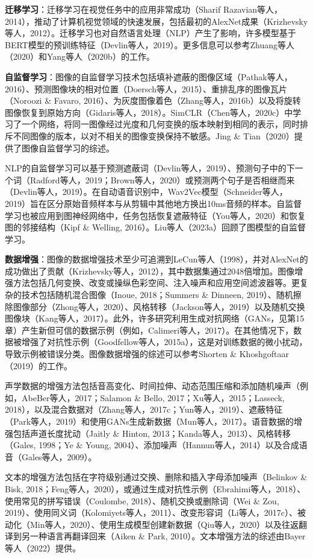 \documentclass[lang=cn,newtx,10pt,scheme=chinese]{elegantbook}
\begin{document}
\textbf{迁移学习}：迁移学习在视觉任务中的应用非常成功（Sharif Razavian等人，2014），推动了计算机视觉领域的快速发展，包括最初的AlexNet成果（Krizhevsky等人，2012）。迁移学习也对自然语言处理（NLP）产生了影响，许多模型基于BERT模型的预训练特征（Devlin等人，2019）。更多信息可以参考Zhuang等人（2020）和Yang等人（2020b）的工作。

\textbf{自监督学习}：图像的自监督学习技术包括填补遮蔽的图像区域（Pathak等人，2016）、预测图像块的相对位置（Doersch等人，2015）、重排乱序的图像瓦片（Noroozi \& Favaro, 2016）、为灰度图像着色（Zhang等人，2016b）以及将旋转图像恢复到原始方向（Gidaris等人，2018）。SimCLR（Chen等人，2020c）中学习了一个网络，将同一图像经过光度和几何变换的版本映射到相同的表示，同时排斥不同图像的版本，以对不相关的图像变换保持不敏感。Jing \& Tian（2020）提供了图像自监督学习的综述。

NLP的自监督学习可以基于预测遮蔽词（Devlin等人，2019）、预测句子中的下一个词（Radford等人，2019；Brown等人，2020）或预测两个句子是否相继而来（Devlin等人，2019）。在自动语音识别中，Wav2Vec模型（Schneider等人，2019）旨在区分原始音频样本与从剪辑中其他地方换出10ms音频的样本。自监督学习也被应用到图神经网络中，任务包括恢复遮蔽特征（You等人，2020）和恢复图的邻接结构（Kipf \& Welling, 2016）。Liu等人（2023a）回顾了图模型的自监督学习。

\textbf{数据增强}：图像的数据增强技术至少可追溯到LeCun等人（1998），并对AlexNet的成功做出了贡献（Krizhevsky等人，2012），其中数据集通过2048倍增加。图像增强方法包括几何变换、改变或操纵色彩空间、注入噪声和应用空间滤波器等。更复杂的技术包括随机混合图像（Inoue, 2018；Summers \& Dinneen, 2019）、随机擦除图像部分（Zhong等人，2020）、风格转移（Jackson等人，2019）以及随机交换图像块（Kang等人，2017）。此外，许多研究利用生成对抗网络（GANs，见第15章）产生新但可信的数据示例（例如，Calimeri等人，2017）。在其他情况下，数据被增强了对抗性示例（Goodfellow等人，2015a），这是对训练数据的微小扰动，导致示例被错误分类。图像数据增强的综述可以参考Shorten \& Khoshgoftaar（2019）的工作。

声学数据的增强方法包括音高变化、时间拉伸、动态范围压缩和添加随机噪声（例如，AbeBer等人，2017；Salamon \& Bello, 2017；Xu等人，2015；Lasseck, 2018），以及混合数据对（Zhang等人，2017c；Yun等人，2019）、遮蔽特征（Park等人，2019）和使用GANs生成新数据（Mun等人，2017）。语音数据的增强包括声道长度扰动（Jaitly \& Hinton, 2013；Kanda等人，2013）、风格转移（Gales, 1998；Ye \& Young, 2004）、添加噪声（Hannun等人，2014）以及合成语音（Gales等人，2009）。

文本的增强方法包括在字符级别通过交换、删除和插入字母添加噪声（Belinkov \& Bisk, 2018；Feng等人，2020），或通过生成对抗性示例（Ebrahimi等人，2018）、使用常见的拼写错误（Coulombe, 2018）、随机交换或删除词（Wei \& Zou, 2019）、使用同义词（Kolomiyets等人，2011）、改变形容词（Li等人，2017c）、被动化（Min等人，2020）、使用生成模型创建新数据（Qiu等人，2020）以及往返翻译到另一种语言再翻译回来（Aiken \& Park, 2010）。文本增强方法的综述由Bayer等人（2022）提供。
\end{document}
